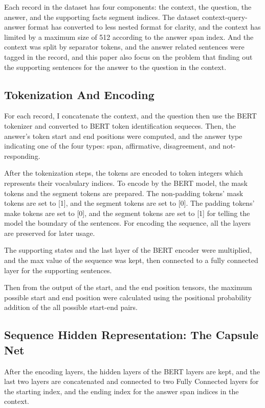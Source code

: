 \documentclass[11pt,a4paper]{article}
\begin{document}
    Each record in the dataset has four components: the context, the question, the answer, and the supporting facts segment indices.
    The dataset context-query-answer format has converted to less nested format for clarity, and the context has limited by a maximum size of 512 according to the answer span index.
    And the context was split by separator tokens, and the answer related sentences were tagged in the record,
    and this paper also focus on the problem that finding out the supporting sentences for the answer to the question in the context.


\subsection{Tokenization And Encoding}

For each record, I concatenate the context, and the question then use the BERT tokenizer and converted to BERT token identification sequeces.
Then, the answer's token start and end positions were computed, and the answer type indicating one of the four types: span, affirmative, disagreement, and not-responding.


After the tokenization steps, the tokens are encoded to token integers which represents their vocabulary indices.
To encode by the BERT model, the mask tokens and the segment tokens are prepared.
The non-padding tokens' mask tokens are set to [1], and the segment tokens are set to [0].
The padding tokens' make tokens are set to [0], and the segment tokens are set to [1] for telling the model the boundary of the sentences.
For encoding the sequence, all the layers are preserved for later usage.

The supporting states and the last layer of the BERT encoder were multiplied, and the max value of the sequence was kept,
then connected to a fully connected layer for the supporting sentences.

Then from the output of the start, and the end position tensors, the maximum possible start and end position were calculated
using the positional probability addition of the all possible start-end pairs.

\subsection{Sequence Hidden Representation: The Capsule Net}

After the encoding layers, the hidden layers of the BERT layers are kept, and the last two layers are concatenated and connected to
two Fully Connected layers for the starting index, and the ending index for the answer span indices in the context.
\end{document}
